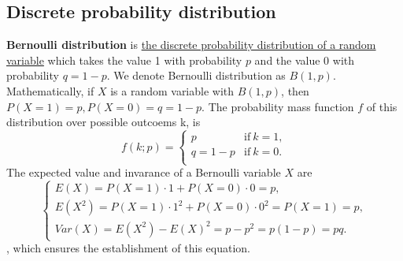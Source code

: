 \documentclass[10pt,onecolumn]{book}
\begin{document}
\subsection{Discrete probability distribution}
\textbf{Bernoulli distribution} is \uline{the discrete probability distribution of a random variable} which takes the value 1 with probability $p$ and the value 0 with probability $q=1-p$. We denote Bernoulli distribution as $B(1, p)$. Mathematically, if $X$ is a random variable with $B(1, p)$, then $P(X=1)=p, P(X=0)=q=1-p$. The probability mass function $f$ of this distribution over possible outcoems k, is 
\begin{equation}
f(k;p) = 
\left\{
	\begin{array}{lr}
	p         & \mathrm{if} \ k = 1,\\
	q = 1 - p & \mathrm{if} \ k = 0. \\
	\end{array}
\right.
\end{equation}
The expected value and invarance  of a Bernoulli variable $X$ are
\begin{equation}\label{eq:bernoulli_distribution_e_var}
\left\{
	\begin{array}{lr}
	E(X) = P(X = 1) \cdot 1 + P(X = 0) \cdot 0 = p, \\
	E(X^2) = P(X = 1) \cdot 1^2 + P(X = 0) \cdot 0^2 = P(X = 1) = p, \\ 
	Var(X) = E(X^2) - E(X)^2 = p - p^2 = p(1 - p) = pq.
	\end{array}
\right.
\end{equation}
{, which ensures the establishment of this equation.}
\end{document}
